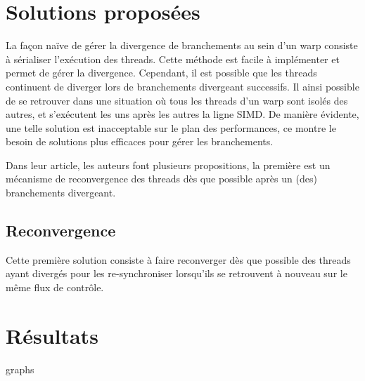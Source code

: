 \documentclass[11pt]{article}
\begin{document}
\section{Solutions proposées}

La façon naïve de gérer la divergence de branchements au sein d'un warp consiste à sérialiser l'exécution des threads.
Cette méthode est facile à implémenter et permet de gérer la divergence.
Cependant, il est possible que les threads continuent de diverger lors de branchements divergeant successifs. Il ainsi possible de se retrouver dans une situation où tous les threads d'un warp sont isolés des autres, et s'exécutent les uns après les autres la ligne SIMD.
De manière évidente, une telle solution est inacceptable sur le plan des performances, ce montre le besoin de solutions plus efficaces pour gérer les branchements.

Dans leur article, les auteurs font plusieurs propositions, la première est un mécanisme de reconvergence des threads dès que possible après un (des) branchements divergeant.

\subsection{Reconvergence}

Cette première solution consiste à faire reconverger dès que possible des threads ayant divergés pour les re-synchroniser lorsqu'ils se retrouvent à nouveau sur le même flux de contrôle.


\section{Résultats}

graphs
\end{document}
